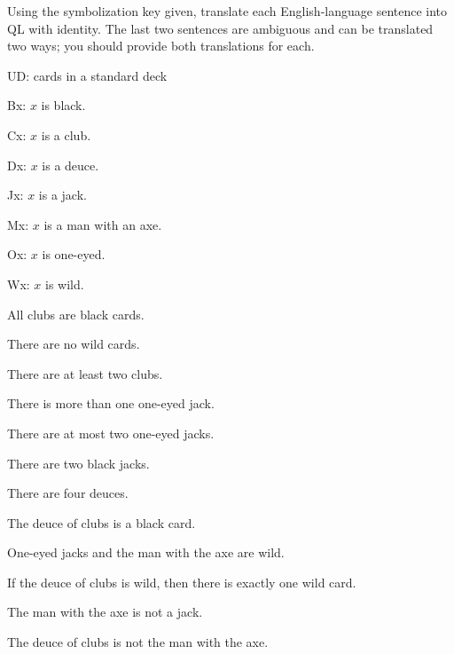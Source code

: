 \solutions
\problempart
\label{pr.QLcards}
Using the symbolization key given, translate each English-language sentence into QL with identity. The last two sentences are ambiguous and can be translated two ways; you should provide both translations for each.
\begin{ekey}
\item[UD:] cards in a standard deck
\item[Bx:] $x$ is black.
\item[Cx:] $x$ is a club.
\item[Dx:] $x$ is a deuce.
\item[Jx:] $x$ is a jack.
\item[Mx:] $x$ is a man with an axe.
\item[Ox:] $x$ is one-eyed.
\item[Wx:] $x$ is wild.
\end{ekey}
\begin{earg}
\item All clubs are black cards.
\item There are no wild cards.
\item There are at least two clubs.
\item There is more than one one-eyed jack.
\item There are at most two one-eyed jacks.
\item There are two black jacks.
\item There are four deuces.
\item The deuce of clubs is a black card.
\item One-eyed jacks and the man with the axe are wild.
\item If the deuce of clubs is wild, then there is exactly one wild card.
\item The man with the axe is not a jack.
\item The deuce of clubs is not the man with the axe.
\end{earg}



